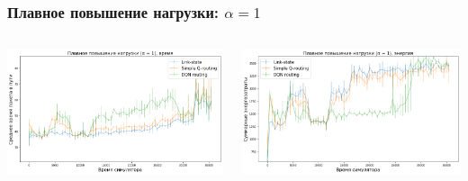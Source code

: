 \documentclass{beamer}
\begin{document}
\begin{frame}
  \frametitle{Плавное повышение нагрузки: $\alpha = 1$}
  \begin{columns}
    \begin{column}{0.5\textwidth}
      \includegraphics[width=\textwidth]{experiment-conveyors-a1-time}
    \end{column}
    \begin{column}{0.5\textwidth}
      \includegraphics[width=\textwidth]{experiment-conveyors-a1-energy}
    \end{column}
  \end{columns}
\end{frame}

\end{document}
